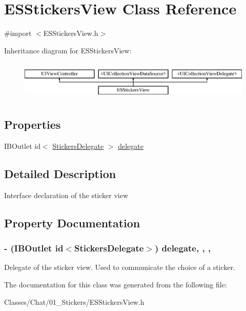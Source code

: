 \hypertarget{interface_e_s_stickers_view}{}\section{E\+S\+Stickers\+View Class Reference}
\label{interface_e_s_stickers_view}


{\ttfamily \#import $<$E\+S\+Stickers\+View.\+h$>$}

Inheritance diagram for E\+S\+Stickers\+View\+:\begin{figure}[H]
\begin{center}
\leavevmode
\includegraphics[height=1.904762cm]{interface_e_s_stickers_view}
\end{center}
\end{figure}
\subsection*{Properties}
\begin{DoxyCompactItemize}
\item 
I\+B\+Outlet id$<$ \hyperlink{protocol_stickers_delegate-p}{Stickers\+Delegate} $>$ \hyperlink{interface_e_s_stickers_view_a6ea3ca4b9399a2df709d07dba12ca6ef}{delegate}
\end{DoxyCompactItemize}


\subsection{Detailed Description}
Interface declaration of the sticker view 

\subsection{Property Documentation}
\hypertarget{interface_e_s_stickers_view_a6ea3ca4b9399a2df709d07dba12ca6ef}{}
\subsubsection[{delegate}]{\setlength{\rightskip}{0pt plus 5cm}-\/ (I\+B\+Outlet id$<${\bf Stickers\+Delegate}$>$) delegate\hspace{0.3cm}{\ttfamily [read]}, {\ttfamily [write]}, {\ttfamily [nonatomic]}, {\ttfamily [assign]}}\label{interface_e_s_stickers_view_a6ea3ca4b9399a2df709d07dba12ca6ef}
Delegate of the sticker view. Used to communicate the choice of a sticker. 

The documentation for this class was generated from the following file\+:\begin{DoxyCompactItemize}
\item 
Classes/\+Chat/01\+\_\+\+Stickers/E\+S\+Stickers\+View.\+h\end{DoxyCompactItemize}
